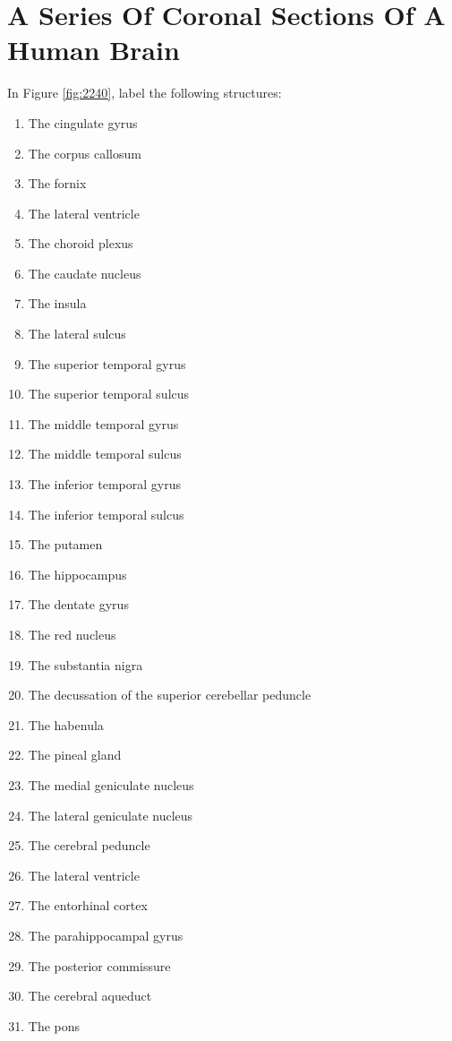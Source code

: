 \documentclass[]{book}
\providecommand{\tightlist}{%
  \setlength{\itemsep}{0pt}\setlength{\parskip}{0pt}}
\begin{document}
\hypertarget{a-series-of-coronal-sections-of-a-human-brain-2}{%
\section{A Series Of Coronal Sections Of A Human Brain}\label{a-series-of-coronal-sections-of-a-human-brain-2}}

In Figure \ref{fig:2240}, label the following structures:

\begin{enumerate}
\def\labelenumi{\arabic{enumi}.}
\tightlist
\item
  The cingulate gyrus
\item
  The corpus callosum
\item
  The fornix
\item
  The lateral ventricle
\item
  The choroid plexus
\item
  The caudate nucleus
\item
  The insula
\item
  The lateral sulcus
\item
  The superior temporal gyrus
\item
  The superior temporal sulcus
\item
  The middle temporal gyrus
\item
  The middle temporal sulcus
\item
  The inferior temporal gyrus
\item
  The inferior temporal sulcus
\item
  The putamen
\item
  The hippocampus
\item
  The dentate gyrus
\item
  The red nucleus
\item
  The substantia nigra
\item
  The decussation of the superior cerebellar peduncle
\item
  The habenula
\item
  The pineal gland
\item
  The medial geniculate nucleus
\item
  The lateral geniculate nucleus
\item
  The cerebral peduncle
\item
  The lateral ventricle
\item
  The entorhinal cortex
\item
  The parahippocampal gyrus
\item
  The posterior commissure
\item
  The cerebral aqueduct
\item
  The pons
\end{enumerate}
\end{document}
